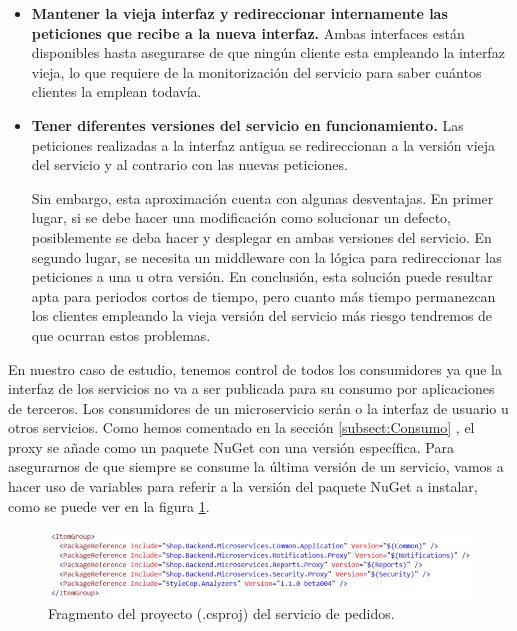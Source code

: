 \documentclass[11pt,spanish,listoffigures]{tfgetsinf}
\begin{document}
\begin{itemize}
\begin{itemize}
\item \textbf{Mantener la vieja interfaz y redireccionar internamente las peticiones que recibe a la nueva interfaz.} Ambas interfaces están disponibles hasta asegurarse de que ningún cliente esta empleando la interfaz vieja, lo que requiere de la monitorización del servicio para saber cuántos clientes la emplean todavía.

\item \textbf{Tener diferentes versiones del servicio en funcionamiento.} Las peticiones realizadas a la interfaz antigua se redireccionan a la versión vieja del servicio y al contrario con las nuevas peticiones.

Sin embargo, esta aproximación cuenta con algunas desventajas. En primer lugar, si se debe hacer una modificación como solucionar un defecto, posiblemente se deba hacer y desplegar en ambas versiones del servicio. En segundo lugar, se necesita un middleware con la lógica para redireccionar las peticiones a una u otra versión. En conclusión, esta solución puede resultar apta para periodos cortos de tiempo, pero cuanto más tiempo permanezcan los clientes empleando la vieja versión del servicio más riesgo tendremos de que ocurran estos problemas. \cite{Newman2015a}

\end{itemize}

\end{itemize}

En nuestro caso de estudio, tenemos control de todos los consumidores ya que la interfaz de los servicios no va a ser publicada para su consumo por aplicaciones de terceros. Los consumidores de un microservicio serán o la interfaz de usuario u otros servicios. Como hemos comentado en la sección \ref{subsect:Consumo} , el proxy se añade como un paquete NuGet con una versión específica. Para asegurarnos de que siempre se consume la última versión de un servicio, vamos a hacer uso de variables para referir a la versión del paquete NuGet a instalar, como se puede ver en la figura \ref{fig:Csproj}.

\begin{figure}[h]
\centering
\includegraphics[scale=0.9]{OrdersNuGets}
\caption{Fragmento del proyecto (.csproj) del servicio de pedidos.}
\label{fig:Csproj}
\end{figure}
\end{document}

